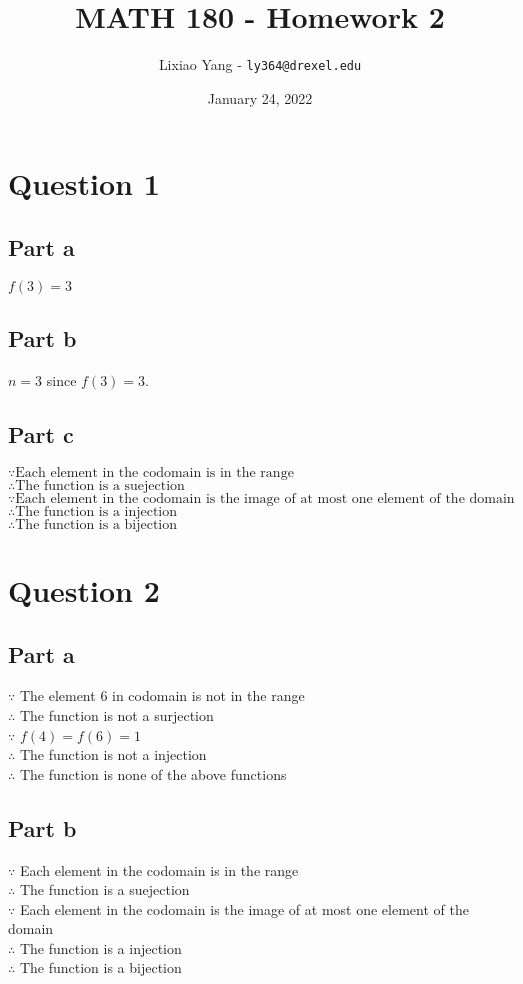 \documentclass[11pt, oneside]{article}   	%
\title{\bf MATH 180 - Homework 2}
\author{Lixiao Yang - \texttt{ly364@drexel.edu}}
\date{January 24, 2022}							%
\begin{document}
\maketitle

\section*{Question 1}

\subsection*{Part a}
$f(3)=3$

\subsection*{Part b}
$n=3$ since $f(3)=3$.

\subsection*{Part c}
$\because \text{Each element in the codomain is in the range}$\\
$\therefore \text{The function is a suejection}$\\
$\because \text{Each element in the codomain is the image of at most one element of the domain}$\\
$\therefore \text{The function is a injection}$\\
$\therefore \text{The function is a bijection}$

\section*{Question 2}

\subsection*{Part a}
$\because$ The element $6$ in codomain is not in the range\\
$\therefore$ The function is not a surjection\\
$\because$ $f(4)=f(6)=1$\\
$\therefore$ The function is not a injection\\
$\therefore$ The function is none of the above functions

\subsection*{Part b}
$\because$ Each element in the codomain is in the range\\
$\therefore$ The function is a suejection\\
$\because$ Each element in the codomain is the image of at most one element of the domain\\
$\therefore$ The function is a injection\\
$\therefore$ The function is a bijection
\end{document}
